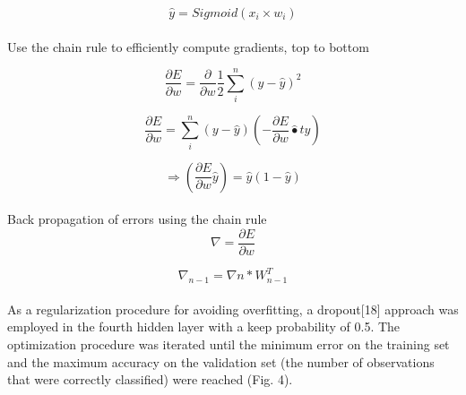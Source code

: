 \documentclass{llncs}       %
\begin{document}
\begin{equation} 
\widehat{y}=Sigmoid(x_{i}\times w_{i})
\end{equation}

\paragraph{}
\paragraph{} Use the chain rule to efficiently compute gradients, top to bottom

\begin{equation} 
\frac{\partial E}{\partial w}=\frac{\partial }{\partial w} \frac{1}{2}\sum_i^n( y -\widehat{y})^2
\end{equation}

\begin{equation} 
\frac{\partial E}{\partial w} = \sum_i^n ( y -\widehat{y})  (-\frac{\partial E}{\partial w}\widehat{•}t{y})
\end{equation}

\begin{equation} 
\Rightarrow(\frac{\partial E}{\partial w}\widehat{y})= \widehat{y}(1-\widehat{y})
\end{equation}

\paragraph{}
\paragraph{}Back propagation of errors using the chain rule
\begin{equation} 
\nabla=\frac{\partial E}{\partial w}
\end{equation}

\begin{equation} 
\nabla_{n-1}=\nabla{n}*W^{T}_{n-1}
\end{equation}

\paragraph{}
\paragraph{}
As a regularization procedure for avoiding overfitting, a dropout[18] approach was employed in the fourth hidden layer with a keep probability of 0.5. The optimization procedure was iterated until the minimum error on the training set and the maximum accuracy on the validation set (the number of observations that were correctly classified) were reached (Fig. 4). 
\end{document}
